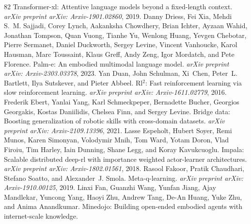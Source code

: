 \documentclass{article}
\begin{document}
\begin{thebibliography}{82}
\newblock Transformer-xl: Attentive language models beyond a fixed-length context.
\newblock \emph{arXiv preprint arXiv: Arxiv-1901.02860}, 2019.
Danny Driess, Fei Xia, Mehdi S.~M. Sajjadi, Corey Lynch, Aakanksha Chowdhery, Brian Ichter, Ayzaan Wahid, Jonathan Tompson, Quan Vuong, Tianhe Yu, Wenlong Huang, Yevgen Chebotar, Pierre Sermanet, Daniel Duckworth, Sergey Levine, Vincent Vanhoucke, Karol Hausman, Marc Toussaint, Klaus Greff, Andy Zeng, Igor Mordatch, and Pete Florence.
\newblock Palm-e: An embodied multimodal language model.
\newblock \emph{arXiv preprint arXiv: Arxiv-2303.03378}, 2023.
Yan Duan, John Schulman, Xi~Chen, Peter~L. Bartlett, Ilya Sutskever, and Pieter Abbeel.
\newblock Rl$^2$: Fast reinforcement learning via slow reinforcement learning.
\newblock \emph{arXiv preprint arXiv: Arxiv-1611.02779}, 2016.
Frederik Ebert, Yanlai Yang, Karl Schmeckpeper, Bernadette Bucher, Georgios Georgakis, Kostas Daniilidis, Chelsea Finn, and Sergey Levine.
\newblock Bridge data: Boosting generalization of robotic skills with cross-domain datasets.
\newblock \emph{arXiv preprint arXiv: Arxiv-2109.13396}, 2021.
Lasse Espeholt, Hubert Soyer, Remi Munos, Karen Simonyan, Volodymir Mnih, Tom Ward, Yotam Doron, Vlad Firoiu, Tim Harley, Iain Dunning, Shane Legg, and Koray Kavukcuoglu.
\newblock Impala: Scalable distributed deep-rl with importance weighted actor-learner architectures.
\newblock \emph{arXiv preprint arXiv: Arxiv-1802.01561}, 2018.
Rasool Fakoor, Pratik Chaudhari, Stefano Soatto, and Alexander~J. Smola.
\newblock Meta-q-learning.
\newblock \emph{arXiv preprint arXiv: Arxiv-1910.00125}, 2019.
Linxi Fan, Guanzhi Wang, Yunfan Jiang, Ajay Mandlekar, Yuncong Yang, Haoyi Zhu, Andrew Tang, De-An Huang, Yuke Zhu, and Anima Anandkumar.
\newblock Minedojo: Building open-ended embodied agents with internet-scale knowledge.

\end{thebibliography}
\end{document}
